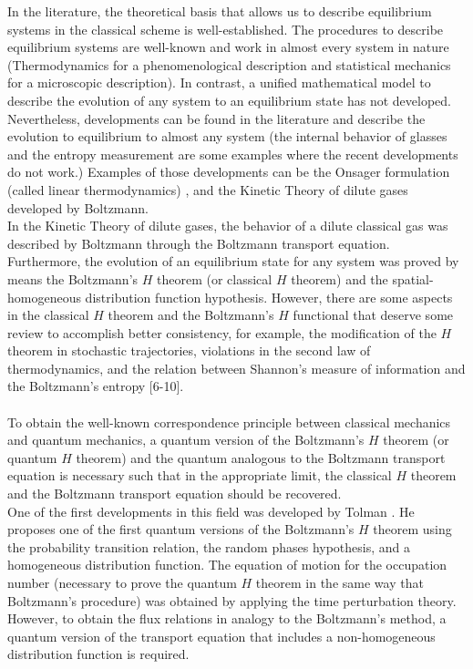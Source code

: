 \documentclass{article}
\begin{document}
In the literature, the theoretical basis that allows us to describe equilibrium systems in the classical scheme is well-established. The procedures to describe equilibrium systems are well-known and work in almost every system in nature (Thermodynamics for a phenomenological description and statistical mechanics for a microscopic description). In contrast, a unified mathematical model to describe the evolution of any system to an equilibrium state has not developed. Nevertheless, developments can be found in the literature and describe the evolution to equilibrium to almost any system (the internal behavior of glasses \cite{cristal1} and the entropy measurement \cite{cristal2, cristal3} are some examples where the recent developments do not work.) Examples of those developments can be the Onsager formulation (called linear thermodynamics) \cite{kei, onsager}, and the Kinetic Theory of dilute gases developed by Boltzmann.\\
In the Kinetic Theory of dilute gases, the behavior of a dilute classical gas was described by Boltzmann through the Boltzmann transport equation. Furthermore, the evolution of an equilibrium state for any system was proved by means the Boltzmann's $H$ theorem (or classical $H$ theorem) and the spatial-homogeneous distribution function hypothesis.
However, there are some aspects in the classical $H$ theorem and the Boltzmann's $H$ functional that deserve some review to accomplish better consistency, for example, the modification of the $H$ theorem in stochastic trajectories, violations in the second law of thermodynamics, and the relation between Shannon's measure of information and the Boltzmann's entropy  [6-10].\\ 
\\
To obtain the well-known correspondence principle between classical mechanics and quantum mechanics, a quantum version of the Boltzmann's $H$ theorem (or quantum $H$ theorem) and the quantum analogous to the Boltzmann transport equation is necessary such that in the appropriate limit, the  classical $H$ theorem and the Boltzmann transport equation should be recovered.\\
One of the first developments in this field was developed by Tolman \cite{tolman}. He proposes one of the first quantum versions of the Boltzmann's $H$ theorem using the probability transition relation, the random phases hypothesis, and a homogeneous distribution function. The equation of motion for the occupation number (necessary to prove the quantum $H$ theorem in the same way that Boltzmann's procedure) was obtained by applying the time perturbation theory. However, to obtain the flux relations in analogy to the Boltzmann's method, a quantum version of the transport equation that includes a non-homogeneous distribution function is required.\\
\end{document}
